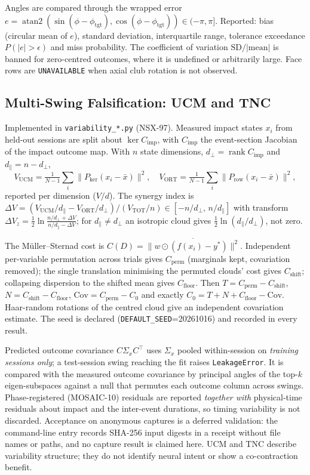 \documentclass[11pt,a4paper]{article}
\begin{document}
Angles are compared through the wrapped error
$e=\operatorname{atan2}(\sin(\phi-\phi_{\mathrm{tgt}}),\cos(\phi-\phi_{\mathrm{tgt}}))\in(-\pi,\pi]$.
Reported: bias (circular mean of $e$), standard deviation, interquartile range,
tolerance exceedance $P(\lvert e\rvert>\epsilon)$ and miss probability.  The
coefficient of variation $\mathrm{SD}/\lvert\mathrm{mean}\rvert$ is banned for
zero-centred outcomes, where it is undefined or arbitrarily large.  Face rows
are \texttt{UNAVAILABLE} when axial club rotation is not observed.

\subsection{Multi-Swing Falsification: UCM and TNC}
\label{sec:var-ucm-tnc}

Implemented in \texttt{variability\_*.py} (NSX-97).  Measured impact states
$x_i$ from held-out sessions are split about $\ker C_{\mathrm{imp}}$, with
$C_{\mathrm{imp}}$ the event-section Jacobian of the impact outcome map.
With $n$ state dimensions, $d_\perp=\operatorname{rank}C_{\mathrm{imp}}$ and
$d_\parallel=n-d_\perp$,
\[
V_{\mathrm{UCM}}=\tfrac{1}{N-1}\sum_i\lVert P_{\ker}(x_i-\bar x)\rVert^2,\quad
V_{\mathrm{ORT}}=\tfrac{1}{N-1}\sum_i\lVert P_{\mathrm{row}}(x_i-\bar x)\rVert^2,
\]
reported per dimension ($V/d$).  The synergy index is
$\Delta V=(V_{\mathrm{UCM}}/d_\parallel-V_{\mathrm{ORT}}/d_\perp)/(V_{\mathrm{TOT}}/n)
\in[-n/d_\perp,\,n/d_\parallel]$ with transform
$\Delta V_z=\tfrac12\ln\frac{n/d_\perp+\Delta V}{n/d_\parallel-\Delta V}$;
for $d_\parallel\ne d_\perp$ an isotropic cloud gives
$\tfrac12\ln(d_\parallel/d_\perp)$, not zero.

The Müller--Sternad cost is $C(D)=\overline{\lVert w\odot(f(x_i)-y^\ast)\rVert^2}$.
Independent per-variable permutation across trials gives $C_{\mathrm{perm}}$
(marginals kept, covariation removed); the single translation minimising the
permuted clouds' cost gives $C_{\mathrm{shift}}$; collapsing dispersion to the
shifted mean gives $C_{\mathrm{floor}}$.  Then
$T=C_{\mathrm{perm}}-C_{\mathrm{shift}}$, $N=C_{\mathrm{shift}}-C_{\mathrm{floor}}$,
$\mathrm{Cov}=C_{\mathrm{perm}}-C_0$ and exactly
$C_0=T+N+C_{\mathrm{floor}}-\mathrm{Cov}$.  Haar-random rotations of the
centred cloud give an independent covariation estimate.  The seed is declared
(\texttt{DEFAULT\_SEED}=20261016) and recorded in every result.

Predicted outcome covariance $C\Sigma_xC^\top$ uses $\Sigma_x$ pooled
within-session on \emph{training sessions only}; a test-session swing reaching
the fit raises \texttt{LeakageError}.  It is compared with the measured
outcome covariance by principal angles of the top-$k$ eigen-subspaces against a
null that permutes each outcome column across swings.  Phase-registered
(MOSAIC-10) residuals are reported \emph{together with} physical-time
residuals about impact and the inter-event durations, so timing variability is
not discarded.  Acceptance on anonymous captures is a deferred validation: the
command-line entry records SHA-256 input digests in a receipt without file
names or paths, and no capture result is claimed here.  UCM and TNC describe
variability structure; they do not identify neural intent or show a
co-contraction benefit.
\end{document}
